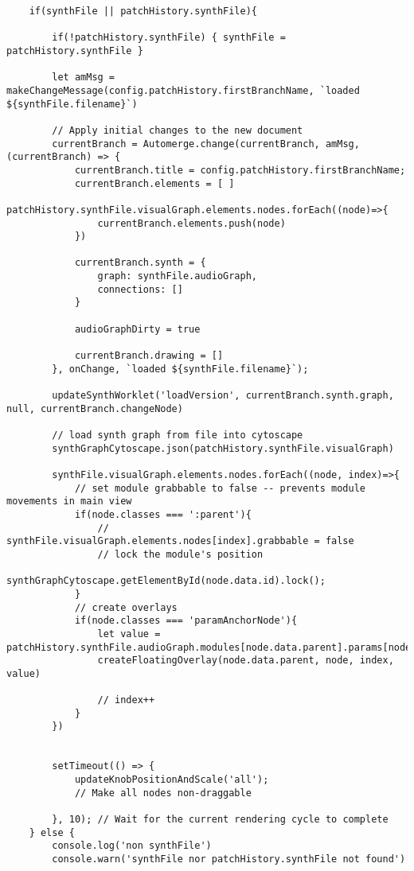 \begin{lstlisting}
    if(synthFile || patchHistory.synthFile){

        if(!patchHistory.synthFile) { synthFile = patchHistory.synthFile }

        let amMsg = makeChangeMessage(config.patchHistory.firstBranchName, `loaded ${synthFile.filename}`)
    
        // Apply initial changes to the new document
        currentBranch = Automerge.change(currentBranch, amMsg, (currentBranch) => {
            currentBranch.title = config.patchHistory.firstBranchName;
            currentBranch.elements = [ ] 
            patchHistory.synthFile.visualGraph.elements.nodes.forEach((node)=>{
                currentBranch.elements.push(node)
            })
            
            currentBranch.synth = {
                graph: synthFile.audioGraph,
                connections: []
            }
            
            audioGraphDirty = true

            currentBranch.drawing = []
        }, onChange, `loaded ${synthFile.filename}`);

        updateSynthWorklet('loadVersion', currentBranch.synth.graph, null, currentBranch.changeNode)
        
        // load synth graph from file into cytoscape
        synthGraphCytoscape.json(patchHistory.synthFile.visualGraph)

        synthFile.visualGraph.elements.nodes.forEach((node, index)=>{
            // set module grabbable to false -- prevents module movements in main view
            if(node.classes === ':parent'){
                // synthFile.visualGraph.elements.nodes[index].grabbable = false
                // lock the module's position
                synthGraphCytoscape.getElementById(node.data.id).lock();
            }
            // create overlays
            if(node.classes === 'paramAnchorNode'){
                let value = patchHistory.synthFile.audioGraph.modules[node.data.parent].params[node.data.label]
                createFloatingOverlay(node.data.parent, node, index, value)
        
                // index++
            }
        })


        setTimeout(() => {
            updateKnobPositionAndScale('all');
            // Make all nodes non-draggable
            
        }, 10); // Wait for the current rendering cycle to complete
    } else { 
        console.log('non synthFile')
        console.warn('synthFile nor patchHistory.synthFile not found')
        

\end{lstlisting}
